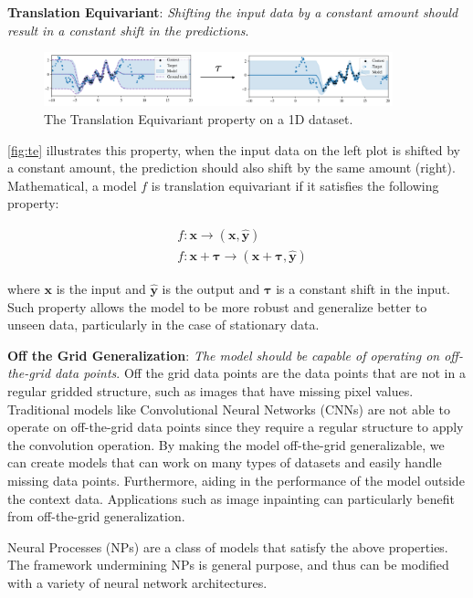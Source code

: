 \documentclass[../../main.tex]{subfiles}
\begin{document}
\textbf{Translation Equivariant}: \emph{Shifting the input data by a constant amount should result in a constant shift in the predictions}. 

\begin{figure}[H]
	\centering
	\includegraphics[width=0.9\textwidth]{./te.png}
	\caption{The Translation Equivariant property on a 1D dataset.}
	\label{fig:te}
\end{figure}


\autoref{fig:te} illustrates this property, when the input data on the left plot is shifted by a constant amount, the prediction should also shift by the same amount (right). Mathematical, a model $f$ is translation equivariant if it satisfies the following property:

\begin{align}
	&f: \bm{x} \rightarrow (\bm{x}, \bm{\hat{y}}) \\
	&f: \bm{x} + \bm{\tau} \rightarrow (\bm{x} + \bm{\tau}, \bm{\hat{y}})
\end{align}

where $\bm{x}$ is the input and $\bm{\hat{y}}$ is the output and $\bm{\tau}$ is a constant shift in the input. Such property allows the model to be more robust and generalize better to unseen data, particularly in the case of stationary data.


\textbf{Off the Grid Generalization}: \emph{The model should be capable of operating on off-the-grid data points}. Off the grid data points are the data points that are not in a regular gridded structure, such as images that have missing pixel values. Traditional models like Convolutional Neural Networks (CNNs) are not able to operate on off-the-grid data points since they require a regular structure to apply the convolution operation. By making the model off-the-grid generalizable, we can create models that can work on many types of datasets and easily handle missing data points. Furthermore, aiding in the performance of the model outside the context data. Applications such as image inpainting can particularly benefit from off-the-grid generalization.


Neural Processes (NPs) \parencite{garnelo2018neural} are a class of models that satisfy the above properties. The framework undermining NPs is general purpose, and thus can be modified with a variety of neural network architectures. 
\end{document}
